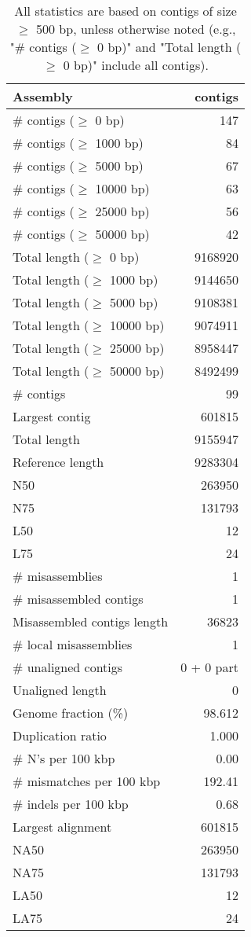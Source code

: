 \documentclass[12pt,a4paper]{article}
\begin{document}
\begin{table}[ht]
\begin{center}
\caption{All statistics are based on contigs of size $\geq$ 500 bp, unless otherwise noted (e.g., "\# contigs ($\geq$ 0 bp)" and "Total length ($\geq$ 0 bp)" include all contigs).}
\begin{tabular}{|l*{1}{|r}|}
\hline
Assembly & contigs \\ \hline
\# contigs ($\geq$ 0 bp) & 147 \\ \hline
\# contigs ($\geq$ 1000 bp) & 84 \\ \hline
\# contigs ($\geq$ 5000 bp) & 67 \\ \hline
\# contigs ($\geq$ 10000 bp) & 63 \\ \hline
\# contigs ($\geq$ 25000 bp) & 56 \\ \hline
\# contigs ($\geq$ 50000 bp) & 42 \\ \hline
Total length ($\geq$ 0 bp) & 9168920 \\ \hline
Total length ($\geq$ 1000 bp) & 9144650 \\ \hline
Total length ($\geq$ 5000 bp) & 9108381 \\ \hline
Total length ($\geq$ 10000 bp) & 9074911 \\ \hline
Total length ($\geq$ 25000 bp) & 8958447 \\ \hline
Total length ($\geq$ 50000 bp) & 8492499 \\ \hline
\# contigs & 99 \\ \hline
Largest contig & 601815 \\ \hline
Total length & 9155947 \\ \hline
Reference length & 9283304 \\ \hline
N50 & 263950 \\ \hline
N75 & 131793 \\ \hline
L50 & 12 \\ \hline
L75 & 24 \\ \hline
\# misassemblies & 1 \\ \hline
\# misassembled contigs & 1 \\ \hline
Misassembled contigs length & 36823 \\ \hline
\# local misassemblies & 1 \\ \hline
\# unaligned contigs & 0 + 0 part \\ \hline
Unaligned length & 0 \\ \hline
Genome fraction (\%) & 98.612 \\ \hline
Duplication ratio & 1.000 \\ \hline
\# N's per 100 kbp & 0.00 \\ \hline
\# mismatches per 100 kbp & 192.41 \\ \hline
\# indels per 100 kbp & 0.68 \\ \hline
Largest alignment & 601815 \\ \hline
NA50 & 263950 \\ \hline
NA75 & 131793 \\ \hline
LA50 & 12 \\ \hline
LA75 & 24 \\ \hline
\end{tabular}
\end{center}
\end{table}
\end{document}
